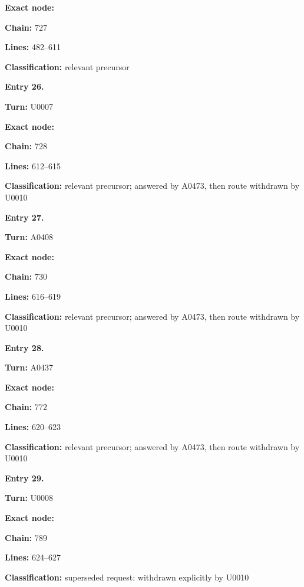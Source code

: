 \textbf{Exact node:} \protect{}

\textbf{Chain:} 727

\textbf{Lines:} 482--611

\textbf{Classification:} relevant precursor


\textbf{Entry 26.}

\textbf{Turn:} U0007

\textbf{Exact node:} \protect{}

\textbf{Chain:} 728

\textbf{Lines:} 612--615

\textbf{Classification:} relevant precursor; answered by A0473, then
route withdrawn by U0010


\textbf{Entry 27.}

\textbf{Turn:} A0408

\textbf{Exact node:} \protect{}

\textbf{Chain:} 730

\textbf{Lines:} 616--619

\textbf{Classification:} relevant precursor; answered by A0473, then
route withdrawn by U0010


\textbf{Entry 28.}

\textbf{Turn:} A0437

\textbf{Exact node:} \protect{}

\textbf{Chain:} 772

\textbf{Lines:} 620--623

\textbf{Classification:} relevant precursor; answered by A0473, then
route withdrawn by U0010


\textbf{Entry 29.}

\textbf{Turn:} U0008

\textbf{Exact node:} \protect{}

\textbf{Chain:} 789

\textbf{Lines:} 624--627

\textbf{Classification:} superseded request: withdrawn explicitly by
U0010



